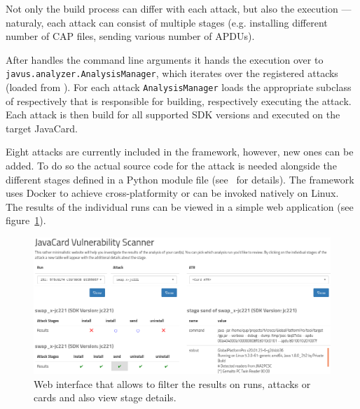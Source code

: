 \documentclass{../llncs/llncs}
\begin{document}
    Not only the build process can differ with each attack, but also the execution --- naturaly, each attack can consist of multiple stages (e.g. installing different number of CAP files, sending various number of APDUs).

    After \shortappclass handles the command line arguments it hands the execution over to \texttt{javus.analyzer.AnalysisManager}, which iterates over the registered attacks (loaded from ). For each attack \texttt{AnalysisManager} loads the appropriate subclass of \shortbuilderclass respectively \shortexecutorclass that is responsible for building, respectively executing the attack. Each attack is then build for all supported SDK versions and executed on the target JavaCard.

    Eight attacks are currently included in the framework, however, new ones can be added. To do so the actual source code for the attack is needed alongside the different stages defined in a Python module file (see~\cite{anon2020thesis} for details). The framework uses Docker to achieve cross-platformity or can be invoked natively on Linux. The results of the individual runs can be viewed in a simple web application (see figure~\ref{fig:web-interface-pic}).

    \begin{figure}[htb]
        \centering
        \includegraphics[width=\textwidth]{src/imgs/overview-plus-detail.png}
        \caption{Web interface that allows to filter the results on runs, attacks or cards and also view stage details.\label{fig:web-interface-pic}}
    \end{figure}
\end{document}

